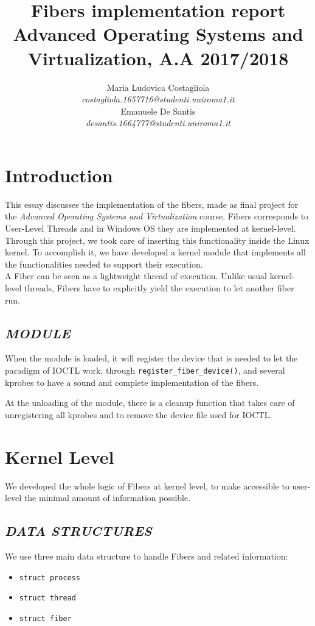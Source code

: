 \documentclass[a4paper]{article}
\author{\large Maria Ludovica Costagliola \\
        \small \textit{costagliola.1657716@studenti.uniroma1.it} \medskip\\
        \large Emanuele De Santis \\
        \small \textit{desantis.1664777@studenti.uniroma1.it}}
\title{Fibers implementation report\\
        \smallskip
        \small Advanced Operating Systems and Virtualization, A.A 2017/2018}
\date{}
\begin{document}
\maketitle
\section{Introduction}
This essay discusses the implementation of the fibers, made as final project for the \textit{Advanced Operating Systems and Virtualization} course. Fibers corresponds to User-Level Threads and in Windows OS they are implemented at kernel-level. Through this project, we took care of inserting this functionality inside the Linux kernel. To accomplish it, we have developed a kernel module that implements all the functionalities needed to support their execution.\bigskip\\
A Fiber can be seen as a lightweight thread of execution. Unlike usual kernel-level threads, Fibers have to explicitly yield the execution to let another fiber run.

\subsection*{\textit{MODULE}}
When the module is loaded, it will register the device that is needed to let the paradigm of IOCTL work, through \texttt{register\_fiber\_device()}, and several kprobes to have a sound and complete implementation of the fibers.

At the unloading of the module, there is a cleanup function that takes care of unregistering all kprobes and to remove the device file used for IOCTL.

\section{Kernel Level}
We developed the whole logic of Fibers at kernel level, to make accessible to user-level the minimal amount of information possible.

\subsection*{\textit{DATA STRUCTURES}}
We use three main data structure to handle Fibers and related information:
\begin{itemize}
  \item \texttt{struct process}
  \item \texttt{struct thread}
  \item \texttt{struct fiber}
\end{itemize}
\end{document}
